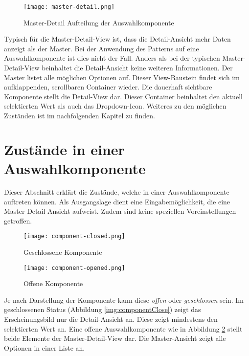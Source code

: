 \begin{figure}[!htb] %
    \centering
    \texttt{[image: master-detail.png]}
    \caption{\centering Master-Detail Aufteilung der Auswahlkomponente}
    \label{img:masterDetailView}
\end{figure}

Typisch für die Master-Detail-View ist, dass die Detail-Ansicht mehr Daten anzeigt als der Master. 
Bei der Anwendung des Patterns auf eine Auswahlkomponente ist dies nicht der Fall. 
Anders als bei der typischen Master-Detail-View beinhaltet die Detail-Ansicht keine weiteren Informationen. 
Der Master listet alle möglichen Optionen auf. 
Dieser View-Baustein findet sich im aufklappenden, scrollbaren Container wieder. 
Die dauerhaft sichtbare Komponente stellt die Detail-View dar. 
Dieser Container beinhaltet den aktuell selektierten Wert als auch das Dropdown-Icon. 
Weiteres zu den möglichen Zuständen ist im nachfolgenden Kapitel zu finden. 


\section{Zustände in einer Auswahlkomponente}
\label{sec:states}

Dieser Abschnitt erklärt die Zustände, welche in einer Auswahlkomponente auftreten können. 
Als Ausgangslage dient eine Eingabemöglichkeit, die eine Master-Detail-Ansicht aufweist. 
Zudem sind keine speziellen Voreinstellungen getroffen. 

\begin{figure}[!htb] %
    \centering
    \begin{minipage}[b]{0.4\textwidth}
        \centering
        \texttt{[image: component-closed.png]}
        \caption{\centering Geschlossene Komponente}
        \label{img:componentClose}
    \end{minipage}
    \hfill
    \begin{minipage}[b]{0.55\textwidth}
        \centering
        \texttt{[image: component-opened.png]}
        \caption{\centering Offene Komponente}
        \label{img:componentOpen}
    \end{minipage}
\end{figure}

Je nach Darstellung der Komponente kann diese \emph{offen} oder \emph{geschlossen} sein. 
Im geschlossenen Status (Abbildung \ref{img:componentClose}) zeigt das Erscheinungsbild nur die Detail-Ansicht an.
Diese zeigt mindestens den selektierten Wert an. 
Eine offene Auswahlkomponente wie in Abbildung \ref{img:componentOpen} stellt beide Elemente der Master-Detail-View dar. 
Die Master-Ansicht zeigt alle Optionen in einer Liste an. 

